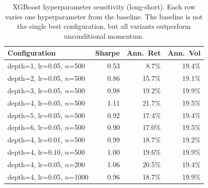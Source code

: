 \begin{table}[H]
\centering
\small
\begin{tabular}{l r r r}
\toprule
Configuration & Sharpe & Ann.\ Ret & Ann.\ Vol \\
\midrule
depth=1, lr=0.05, $n$=500                & 0.53 & 8.7\%  & 19.4\% \\
depth=2, lr=0.05, $n$=500                & 0.86 & 15.7\% & 19.1\% \\
depth=3, lr=0.05, $n$=500                & 0.98 & 19.2\% & 19.9\% \\
depth=4, lr=0.05, $n$=500                & 1.11 & 21.7\% & 19.5\% \\
depth=5, lr=0.05, $n$=500                & 0.92 & 17.4\% & 19.4\% \\
depth=6, lr=0.05, $n$=500                & 0.90 & 17.0\% & 19.5\% \\
\midrule
depth=4, lr=0.01, $n$=500                & 0.99 & 18.7\% & 19.2\% \\
depth=4, lr=0.10, $n$=500                & 1.00 & 19.6\% & 19.9\% \\
\midrule
depth=4, lr=0.05, $n$=200                & 1.06 & 20.5\% & 19.4\% \\
depth=4, lr=0.05, $n$=1000               & 0.96 & 18.7\% & 19.9\% \\
\bottomrule
\end{tabular}
\caption{XGBoost hyperparameter sensitivity (long-short). Each row varies one hyperparameter from the baseline. The baseline is not the single best configuration, but all variants outperform unconditional momentum.}
\label{tab:xgb_hyperparams}
\end{table}